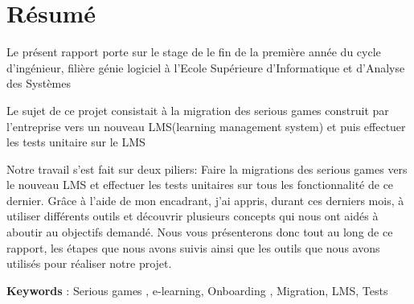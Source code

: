 \chapter*{Résumé}

Le présent rapport porte sur le stage de le fin de la première année du cycle d'ingénieur, filière génie logiciel à l'Ecole Supérieure d'Informatique et d'Analyse des Systèmes 

Le sujet de ce projet consistait à la migration des serious games construit par l'entreprise vers un nouveau LMS(learning management system) et puis effectuer les tests unitaire sur le LMS

 Notre travail s’est fait sur deux piliers:
 Faire la migrations des serious games vers le nouveau LMS et effectuer les tests unitaires sur tous les fonctionnalité de ce dernier.
 Grâce à l’aide de mon encadrant,  j'ai appris, durant ces derniers mois, à utiliser
différents outils et découvrir plusieurs concepts qui nous ont aidés à aboutir au objectifs demandé.
 Nous vous présenterons donc tout au long de ce rapport, les étapes que nous avons
suivis ainsi que les outils que nous avons utilisés pour réaliser notre projet. 

\textbf{Keywords} : Serious games , e-learning,  Onboarding , Migration, LMS, Tests
